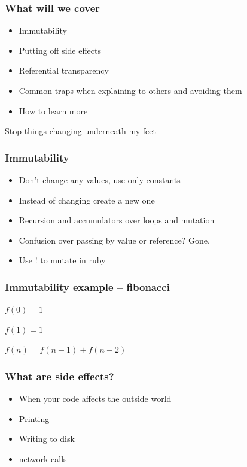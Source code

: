 \documentclass{beamer}
\begin{document}
\begin{frame}
  \frametitle{What will we cover}
  \begin{itemize}
    \item Immutability
    \item Putting off side effects
    \item Referential transparency
    \item Common traps when explaining to others and avoiding them
    \item How to learn more
  \end{itemize}
\end{frame}

\begin{frame}
  \begin{center}
    \Huge Stop things changing underneath my feet
  \end{center}
\end{frame}

\begin{frame}
  \frametitle{Immutability}
  \begin{itemize}
    \item Don't change any values, use only constants
    \item Instead of changing create a new one
    \item Recursion and accumulators over loops and mutation
    \item Confusion over passing by value or reference? Gone.
    \item Use ! to mutate in ruby
  \end{itemize}
\end{frame}

\begin{frame}
  \frametitle{Immutability example -- fibonacci}
  $f(0) = 1$

  $f(1) = 1$

  $f(n) = f(n - 1) +f(n - 2)$
\end{frame}

\begin{frame}
  \frametitle{What are side effects?}
  \begin{itemize}
    \item When your code affects the outside world
    \item Printing
    \item Writing to disk
    \item network calls
  \end{itemize}
\end{frame}
\end{document}
